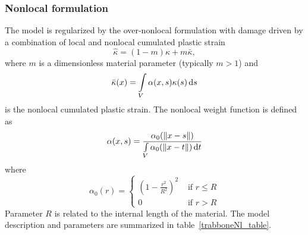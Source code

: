 \documentclass[a4paper]{article}
\begin{document}
\subsubsection{Nonlocal formulation}
The model is regularized by the over-nonlocal formulation with damage driven by a combination of local and nonlocal cumulated plastic strain
\begin{equation}\label{overKappa}
\hat{\kappa} = (1-m)\kappa + m\bar{\kappa},
\end{equation}
where $m$ is a dimensionless material parameter (typically $m>1$) and
\begin{equation}\label{nonLocalPlStrain}
\bar{\kappa}(x) = \int\limits_V \alpha(x,s)\kappa(s)\,{\rm d}s
\end{equation}
is the nonlocal cumulated plastic strain. The nonlocal weight function is defined as
\begin{equation}
\alpha(x,s) = \frac{\alpha_0(\Vert x-s\Vert )}{\int\limits_V\alpha_0(\Vert x-t\Vert )\,{\rm d}t}
\end{equation}
where
\begin{equation}
\alpha_0(r) =\left\{\begin{array}{cc} \left(1-\frac{r^2}{R^2}\right)^2 & \mbox{ if } r\le R \\ 0 & \mbox{ if } r> R \end{array}\right.
\end{equation}
Parameter $R$ is related to the internal length of the material.
The model description and parameters are summarized in table~\ref{trabboneNl_table}.
\end{document}
